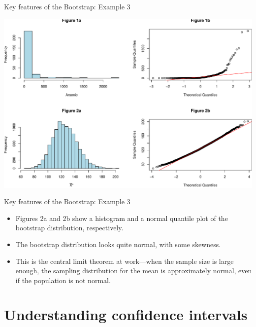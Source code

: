 \documentclass[
  ignorenonframetext,
]{beamer}
\begin{document}
\begin{frame}{Key features of the Bootstrap: Example 3}
\protect\hypertarget{key-features-of-the-bootstrap-example-3-2}{}
\tiny

\begin{center}\includegraphics[width=0.9\linewidth,height=0.85\textheight]{Week10_Lect_files/figure-beamer/unnamed-chunk-7-1} \end{center}
\normalsize
\end{frame}

\begin{frame}{Key features of the Bootstrap: Example 3}
\protect\hypertarget{key-features-of-the-bootstrap-example-3-3}{}
\begin{itemize}
\item
  Figures 2a and 2b show a histogram and a normal quantile plot of the
  bootstrap distribution, respectively.
\item
  The bootstrap distribution looks quite normal, with some skewness.
\item
  This is the central limit theorem at work---when the sample size is
  large enough, the sampling distribution for the mean is approximately
  normal, even if the population is not normal.
\end{itemize}
\end{frame}

\hypertarget{understanding-confidence-intervals}{%
\section{Understanding confidence
intervals}\label{understanding-confidence-intervals}}
\end{document}
